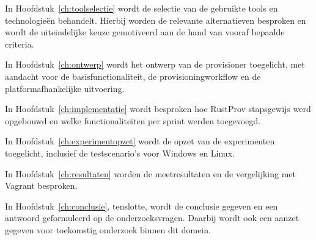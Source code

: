 In Hoofdstuk~\ref{ch:toolselectie} wordt de selectie van de gebruikte tools en technologieën behandelt. Hierbij worden de relevante alternatieven besproken en wordt de uiteindelijke keuze gemotiveerd aan de hand van vooraf bepaalde criteria.

In Hoofdstuk~\ref{ch:ontwerp} wordt het ontwerp van de provisioner toegelicht, met aandacht voor de basisfunctionaliteit, de provisioningworkflow en de platformafhankelijke uitvoering.

In Hoofdstuk~\ref{ch:implementatie} wordt besproken hoe RustProv stapsgewijs werd opgebouwd en welke functionaliteiten per sprint werden toegevoegd.

In Hoofdstuk~\ref{ch:experimentopzet} wordt de opzet van de experimenten toegelicht, inclusief de testscenario's voor Windows en Linux.

In Hoofdstuk~\ref{ch:resultaten} worden de meetresultaten en de vergelijking met Vagrant besproken.


In Hoofdstuk~\ref{ch:conclusie}, tenslotte, wordt de conclusie gegeven en een antwoord geformuleerd op de onderzoeksvragen. Daarbij wordt ook een aanzet gegeven voor toekomstig onderzoek binnen dit domein.